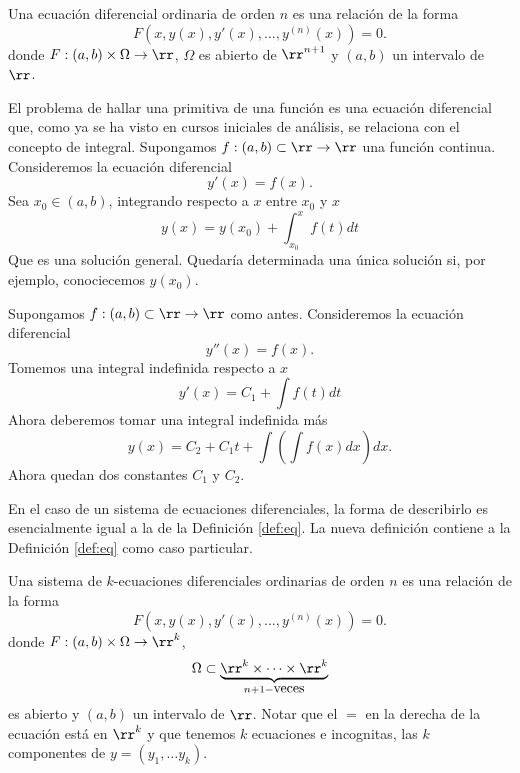 \begin{definicion}\label{def:eq} Una ecuación diferencial
ordinaria de orden $n$ es una relación de la forma
\[\boxed{F(x,y(x),y'(x),\ldots,y^{(n)}(x))=0}.\]
donde $F:(a,b)\times \Omega\to\rr$, $\Omega$ es abierto de $\rr^{n+1}$ y $(a,b)$ un intervalo de $\rr$.
  \end{definicion}





\begin{ejemplo} El problema de hallar una primitiva de una función es una ecuación
diferencial que, como ya se ha visto en cursos iniciales de análisis, se relaciona con el concepto de integral. Supongamos $f:(a,b)\subset \rr\to\rr$ una función continua. Consideremos la ecuación diferencial
\[y'(x)=f(x).\]
Sea $x_0\in(a,b)$, integrando respecto a $x$ entre $x_0$ y $x$
\[y(x)=y(x_0)+\int_{x_0}^xf(t)dt\]
Que es una solución general. Quedaría determinada una única solución si, por ejemplo, conociecemos $y(x_0)$.
\end{ejemplo}



\begin{ejemplo} Supongamos $f:(a,b)\subset \rr\to\rr$ como antes. Consideremos la ecuación diferencial
\[y''(x)=f(x).\]
Tomemos una integral indefinida respecto a $x$ 
\[y'(x)=C_1+\int f(t)dt\]
Ahora deberemos tomar una integral indefinida más
\[y(x)=C_2+C_1t +\int\left(\int f(x)dx\right)dx.\]
Ahora quedan dos constantes $C_1$ y $C_2$. 
\end{ejemplo}

En el caso de un sistema de ecuaciones diferenciales, la forma de describirlo es esencialmente 
 igual a la de la Definición \ref{def:eq}. La nueva definición contiene a la Definición \ref{def:eq}
 como caso particular.

 \begin{definicion}\label{def:sist_eq} 
 Una sistema de $k$-ecuaciones diferenciales ordinarias de orden $n$ 
 es una relación de la forma
\[\boxed{F(x,y(x),y'(x),\ldots,y^{(n)}(x))=0}.\]
donde $F:(a,b)\times \Omega\to\rr^k$, 
\[\Omega\subset\underbrace{\rr^k\times\cdots\times\rr^k}_{n+1-\hbox{veces}}\]
es abierto y $(a,b)$ un intervalo de $\rr$. Notar que el $=$ en la derecha de la ecuación está
en $\rr^k$ y que tenemos $k$ ecuaciones e incognitas, las $k$ componentes de
$y=(y_1,\ldots y_k)$.
  \end{definicion}
  
